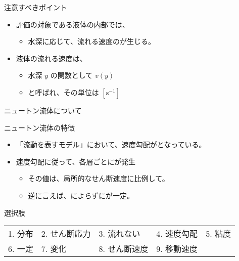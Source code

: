 \documentclass[uplatex,dvipdfmx,a4paper,11pt]{jsarticle}
\begin{document}
\begin{qlist}
\begin{qlist2}
\begin{center}
\begin{minipage}{0.9\textwidth}
\begin{center}
\begin{itembox}[l]{注意すべきポイント}
\begin{itemize}
							\item 評価の対象である液体の内部では、
							\begin{itemize}
								\item 水深に応じて、流れる速度の\qbox{}が生じる。
							\end{itemize}
							\item 液体の流れる速度は、
							\begin{itemize}
								\item 水深 $y$ の関数として $v(y)$
								\item \qbox{}と呼ばれ、その単位は $[\mathrm{s^{-1}}]$
							\end{itemize}
						\end{itemize}
					\end{itembox}
					\end{center}
				\end{minipage}
			\end{center}
			
			\vspace{5mm}
			\qitem ニュートン流体について
			\begin{center}
				\begin{minipage}{0.9\textwidth}
					\begin{center}
					\begin{itembox}[l]{ニュートン流体の特徴}
						\begin{itemize}
							\item 「流動を表すモデル」において、速度勾配が\qbox{}となっている。
							\item 速度勾配に従って、各層ごとに\qbox{}が発生
							\begin{itemize}
								\item その値は、局所的なせん断速度に比例して\qbox{}。
								\item 逆に言えば、\qbox{}によらずに\qbox{}が一定。
							\end{itemize}
						\end{itemize}
					\end{itembox}
					\end{center}
				\end{minipage}
			\end{center}

		\end{qlist2}

		\begin{itembox}[l]{選択肢}
			\begin{center}
				\begin{tabular}{lllll}
					1. 分布	&2. せん断応力 &3. 流れない	&4. 速度勾配	&5. 粘度\\
					6. 一定	&7. 変化  &8. せん断速度	&9. 移動速度
				\end{tabular}
			\end{center}
		\end{itembox}
\end{qlist}
\end{document}
